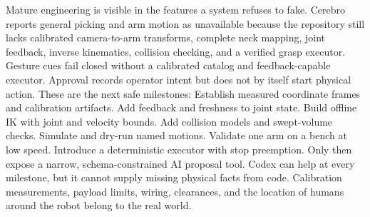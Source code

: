 {}\markdownRendererThematicBreak{}\markdownRendererInterblockSeparator
{}
\markdownRendererSectionEnd 
\markdownRendererSectionEnd \markdownRendererSectionBegin
{}\markdownRendererInterblockSeparator
{}Mature engineering is visible in the features a system refuses to fake.\markdownRendererSoftLineBreak
{}Cerebro reports general picking and arm motion as unavailable because the\markdownRendererSoftLineBreak
{}repository still lacks calibrated camera-to-arm transforms, complete neck\markdownRendererSoftLineBreak
{}mapping, joint feedback, inverse kinematics, collision checking, and a verified\markdownRendererSoftLineBreak
{}grasp executor. Gesture cues fail closed without a calibrated catalog and\markdownRendererSoftLineBreak
{}feedback-capable executor. Approval records operator intent but does not by\markdownRendererSoftLineBreak
{}itself start physical action.\markdownRendererParagraphSeparator
{}These are the next safe milestones:\markdownRendererInterblockSeparator
{}\markdownRendererOlBegin
{}Establish measured coordinate frames and calibration artifacts.\markdownRendererOlItemEnd 
{}Add feedback and freshness to joint state.\markdownRendererOlItemEnd 
{}Build offline IK with joint and velocity bounds.\markdownRendererOlItemEnd 
{}Add collision models and swept-volume checks.\markdownRendererOlItemEnd 
{}Simulate and dry-run named motions.\markdownRendererOlItemEnd 
{}Validate one arm on a bench at low speed.\markdownRendererOlItemEnd 
{}Introduce a deterministic executor with stop preemption.\markdownRendererOlItemEnd 
{}Only then expose a narrow, schema-constrained AI proposal tool.\markdownRendererOlItemEnd 
\markdownRendererOlEnd \markdownRendererInterblockSeparator
{}Codex can help at every milestone, but it cannot supply missing physical facts\markdownRendererSoftLineBreak
{}from code. Calibration measurements, payload limits, wiring, clearances, and\markdownRendererSoftLineBreak
{}the location of humans around the robot belong to the real world.\markdownRendererInterblockSeparator
{}\markdownRendererThematicBreak{}\markdownRendererInterblockSeparator
{}
\markdownRendererSectionEnd \markdownRendererSectionBegin
{}\markdownRendererInterblockSeparator
